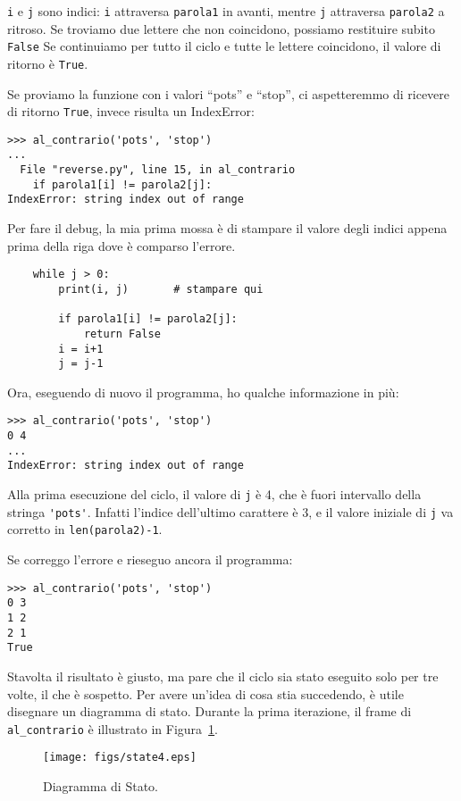 \documentclass[10pt]{book}
\begin{document}
{\tt i} e {\tt j} sono indici: {\tt i} attraversa {\tt parola1}
in avanti, mentre {\tt j} attraversa {\tt parola2} a ritroso. Se troviamo due lettere che non coincidono, possiamo restituire subito {\tt False} Se continuiamo per tutto il ciclo e tutte le lettere coincidono, il valore di ritorno è {\tt True}.

Se proviamo la funzione con i valori ``pots'' e ``stop'', ci aspetteremmo di ricevere di ritorno {\tt True}, invece risulta un IndexError:

\begin{verbatim}
>>> al_contrario('pots', 'stop')
...
  File "reverse.py", line 15, in al_contrario
    if parola1[i] != parola2[j]:
IndexError: string index out of range
\end{verbatim}
%
Per fare il debug, la mia prima mossa è di stampare il valore degli indici appena prima della riga dove è comparso l'errore.

\begin{verbatim}
    while j > 0:
        print(i, j)       # stampare qui
        
        if parola1[i] != parola2[j]:
            return False
        i = i+1
        j = j-1
\end{verbatim}
%
Ora, eseguendo di nuovo il programma, ho qualche informazione in più:

\begin{verbatim}
>>> al_contrario('pots', 'stop')
0 4
...
IndexError: string index out of range
\end{verbatim}
%
Alla prima esecuzione del ciclo, il valore di {\tt j} è 4,
che è fuori intervallo della stringa \verb"'pots'".
Infatti l'indice dell'ultimo carattere è 3, e il valore iniziale di {\tt j} va corretto in {\tt len(parola2)-1}.

Se correggo l'errore e rieseguo ancora il programma:

\begin{verbatim}
>>> al_contrario('pots', 'stop')
0 3
1 2
2 1
True
\end{verbatim}
%
Stavolta il risultato è giusto, ma pare che il ciclo sia stato eseguito solo per tre volte, il che è sospetto. Per avere un'idea di cosa stia succedendo, è utile disegnare un diagramma di stato. Durante la prima iterazione, il frame di \verb"al_contrario" è illustrato in Figura~\ref{fig.state4}.

\begin{figure}
\centerline
{\texttt{[image: figs/state4.eps]}}
\caption{Diagramma di Stato.}
\label{fig.state4}
\end{figure}
\end{document}
